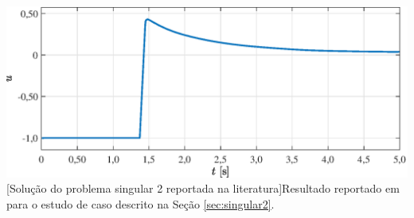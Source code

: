 \noindent	
\begin{minipage}{\textwidth}
	\vspace{\onelineskip}
	\centering
	\includegraphics[scale=0.7]{fig/resultados/singular2/obs/original}
	[Solução do problema singular 2 reportada na literatura]{Resultado reportado em  para o estudo de caso descrito na Seção \ref{sec:singular2}.}
	\label{fig:singular2:jacobson}
	\vspace{\onelineskip}
\end{minipage} 